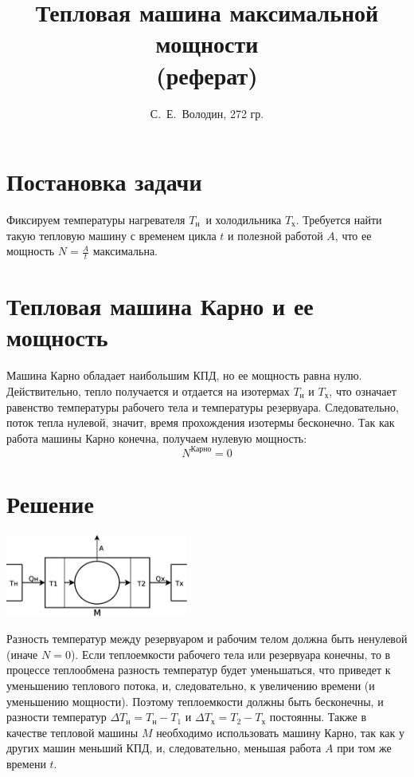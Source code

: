 \documentclass[a4paper]{article}
\title{Тепловая машина максимальной мощности\\(реферат)}
\author{С.~Е.~Володин, 272 гр.}
\date{}
\newcommand{\Tx}{$T_\text{х}$}
\newcommand{\Tn}{$T_\text{н}$}
\begin{document}
\maketitle
\section{Постановка задачи}
Фиксируем температуры нагревателя \Tn\ и холодильника \Tx. Требуется найти такую тепловую машину с временем цикла $t$ и полезной работой $A$, что ее мощность
$
N=\frac{A}{t}
$
максимальна.
\section{Тепловая машина Карно и ее мощность}
Машина Карно обладает наибольшим КПД, но ее мощность равна нулю. Действительно, тепло получается и отдается на изотермах $T_{\text{н}}$ и $T_{\text{х}}$, что означает равенство температуры рабочего тела и температуры резервуара. Следовательно, поток тепла нулевой, значит, время прохождения изотермы бесконечно. Так как работа машины Карно конечна, получаем нулевую мощность:
$$N^{\text{Карно}}=0$$
\section{Решение}
\begin{floatingfigure}[l]{7cm}
\includegraphics[width=6cm]{maxN}
\end{floatingfigure}
Разность температур между резервуаром и рабочим телом должна быть ненулевой (иначе $N=0$).\newline
Если теплоемкости рабочего тела или резервуара конечны, то в процессе теплообмена разность температур будет уменьшаться, что приведет к уменьшению теплового потока, и, следовательно, к увеличению времени (и уменьшению мощности). Поэтому теплоемкости должны быть бесконечны, и разности температур $\Delta T_\text{н}=T_\text{н}-T_1$ и $\Delta T_\text{х}=T_2-T_\text{х}$ постоянны.\newline
Также в качестве тепловой машины $M$ необходимо использовать машину Карно, так как у других машин меньший КПД, и, следовательно, меньшая работа $A$ при том же времени $t$.
\end{document}
